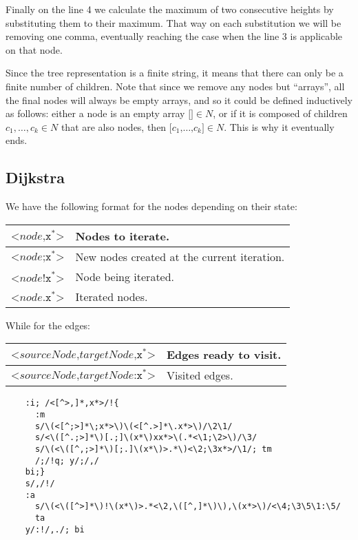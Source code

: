 Finally on the line 4 we calculate the maximum of two consecutive heights
by substituting them to their maximum.  That way on each substitution we
will be removing one comma, eventually reaching the case when the line 3
is applicable on that node.

Since the tree representation is a finite string, it means that there can
only be a finite number of children.  Note that since we remove any nodes
but ``arrays'', all the final nodes will always be empty arrays, and so
it could be defined inductively as follows:
either a node is an empty array $\texttt{[]}\in N$, or if it is
composed of children $c_1, \ldots, c_k\in N$ that are also nodes, then
$\texttt{[}c_1\texttt{,}\ldots\texttt{,}c_k\texttt{]} \in N$.  This is why
it eventually ends.

\subsection{Dijkstra}
We have the following format for the nodes depending on their state:
\begin{center}
	\begin{tabular}{|l|l|}
		\hline
		$\texttt{<}node\texttt{,x}^*\texttt{>}$ & Nodes to iterate.\\
		\hline
		$\texttt{<}node\texttt{;x}^*\texttt{>}$
			& New nodes created at the current iteration.\\
		\hline
		$\texttt{<}node\texttt{!x}^*\texttt{>}$ & Node being iterated.\\
		\hline
		$\texttt{<}node\texttt{.x}^*\texttt{>}$ & Iterated nodes.\\
		\hline
	\end{tabular}
\end{center}

While for the edges:
\begin{center}
	\begin{tabular}{|l|l|}
		\hline
		$\texttt{<}sourceNode\texttt{,}targetNode\texttt{,x}^*\texttt{>}$
			& Edges ready to visit.\\
		\hline
		$\texttt{<}sourceNode\texttt{,}targetNode\texttt{:x}^*\texttt{>}$
			& Visited edges.\\
		\hline
	\end{tabular}
\end{center}

\begin{Verbatim}
	:i; /<[^>,]*,x*>/!{
	  :m
	  s/\(<[^;>]*\;x*>\)\(<[^.>]*\.x*>\)/\2\1/
	  s/<\([^.;>]*\)[.;]\(x*\)xx*>\(.*<\1;\2>\)/\3/
	  s/\(<\([^,;>]*\)[;.]\(x*\)>.*\)<\2;\3x*>/\1/; tm
	  /;/!q; y/;/,/
	bi;}
	s/,/!/
	:a
	  s/\(<\([^>]*\)!\(x*\)>.*<\2,\([^,]*\)\),\(x*>\)/<\4;\3\5\1:\5/
	  ta
	y/:!/,./; bi
\end{Verbatim}

